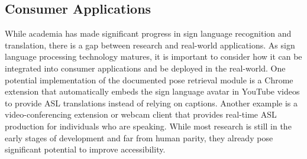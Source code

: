 \documentclass[../paper.tex]{subfiles}
\begin{document}
\subsection*{Consumer Applications}
While academia has made significant progress in sign language recognition and translation, there is a gap between research and real-world applications. As sign language processing technology matures, it is important to consider how it can be integrated into consumer applications and be deployed in the real-world. One potential implementation of the documented pose retrieval module is a Chrome extension that automatically embeds the sign language avatar in YouTube videos to provide ASL translations instead of relying on captions. Another example is a video-conferencing extension or webcam client that provides real-time ASL production for individuals who are speaking. While most research is still in the early stages of development and far from human parity, they already pose significant potential to improve accessibility.
\end{document}
